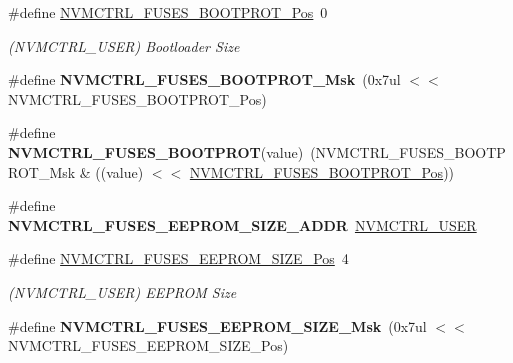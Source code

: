 \begin{DoxyCompactItemize}
\item 
\hypertarget{group__fuses__api_gac2867e0c1d1fc1b327991134a24983ca}{}\#define \hyperlink{group__fuses__api_gac2867e0c1d1fc1b327991134a24983ca}{N\+V\+M\+C\+T\+R\+L\+\_\+\+F\+U\+S\+E\+S\+\_\+\+B\+O\+O\+T\+P\+R\+O\+T\+\_\+\+Pos}~0\label{group__fuses__api_gac2867e0c1d1fc1b327991134a24983ca}

\begin{DoxyCompactList}\small\item\em (N\+V\+M\+C\+T\+R\+L\+\_\+\+U\+S\+E\+R) Bootloader Size \end{DoxyCompactList}\item 
\hypertarget{group__fuses__api_ga88a9f3dd3aa15ef56a9867ae71bf5fce}{}\#define {\bfseries N\+V\+M\+C\+T\+R\+L\+\_\+\+F\+U\+S\+E\+S\+\_\+\+B\+O\+O\+T\+P\+R\+O\+T\+\_\+\+Msk}~(0x7ul $<$$<$ N\+V\+M\+C\+T\+R\+L\+\_\+\+F\+U\+S\+E\+S\+\_\+\+B\+O\+O\+T\+P\+R\+O\+T\+\_\+\+Pos)\label{group__fuses__api_ga88a9f3dd3aa15ef56a9867ae71bf5fce}

\item 
\hypertarget{group__fuses__api_gabba1dc9ec174e4c2a55fca8795d56aa8}{}\#define {\bfseries N\+V\+M\+C\+T\+R\+L\+\_\+\+F\+U\+S\+E\+S\+\_\+\+B\+O\+O\+T\+P\+R\+O\+T}(value)~(N\+V\+M\+C\+T\+R\+L\+\_\+\+F\+U\+S\+E\+S\+\_\+\+B\+O\+O\+T\+P\+R\+O\+T\+\_\+\+Msk \& ((value) $<$$<$ \hyperlink{group__fuses__api_gac2867e0c1d1fc1b327991134a24983ca}{N\+V\+M\+C\+T\+R\+L\+\_\+\+F\+U\+S\+E\+S\+\_\+\+B\+O\+O\+T\+P\+R\+O\+T\+\_\+\+Pos}))\label{group__fuses__api_gabba1dc9ec174e4c2a55fca8795d56aa8}

\item 
\hypertarget{group__fuses__api_ga9f56c050e270b536768d2b27081faac5}{}\#define {\bfseries N\+V\+M\+C\+T\+R\+L\+\_\+\+F\+U\+S\+E\+S\+\_\+\+E\+E\+P\+R\+O\+M\+\_\+\+S\+I\+Z\+E\+\_\+\+A\+D\+D\+R}~\hyperlink{group___s_a_m_l21_j18_a__base_ga7a7a83a5753fa323b61536e396083c99}{N\+V\+M\+C\+T\+R\+L\+\_\+\+U\+S\+E\+R}\label{group__fuses__api_ga9f56c050e270b536768d2b27081faac5}

\item 
\hypertarget{group__fuses__api_gad4d1aae7645f998f9be29556ae21136b}{}\#define \hyperlink{group__fuses__api_gad4d1aae7645f998f9be29556ae21136b}{N\+V\+M\+C\+T\+R\+L\+\_\+\+F\+U\+S\+E\+S\+\_\+\+E\+E\+P\+R\+O\+M\+\_\+\+S\+I\+Z\+E\+\_\+\+Pos}~4\label{group__fuses__api_gad4d1aae7645f998f9be29556ae21136b}

\begin{DoxyCompactList}\small\item\em (N\+V\+M\+C\+T\+R\+L\+\_\+\+U\+S\+E\+R) E\+E\+P\+R\+O\+M Size \end{DoxyCompactList}\item 
\hypertarget{group__fuses__api_gab5af398b29da2f557c6e364dd6c13397}{}\#define {\bfseries N\+V\+M\+C\+T\+R\+L\+\_\+\+F\+U\+S\+E\+S\+\_\+\+E\+E\+P\+R\+O\+M\+\_\+\+S\+I\+Z\+E\+\_\+\+Msk}~(0x7ul $<$$<$ N\+V\+M\+C\+T\+R\+L\+\_\+\+F\+U\+S\+E\+S\+\_\+\+E\+E\+P\+R\+O\+M\+\_\+\+S\+I\+Z\+E\+\_\+\+Pos)\label{group__fuses__api_gab5af398b29da2f557c6e364dd6c13397}


\end{DoxyCompactItemize}
